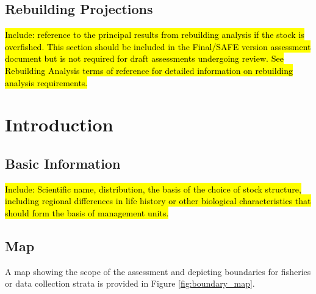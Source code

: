 \documentclass[12pt,]{article}
\begin{document}
\subsection*{Rebuilding Projections}\label{rebuilding-projections}

\hl{Include: reference to the principal results from rebuilding analysis if the 
stock is overfished. This section should be included in the Final/SAFE version 
assessment document but is not required for draft assessments undergoing review. 
See Rebuilding Analysis terms of reference for detailed information on 
rebuilding analysis requirements.}

\FloatBarrier

\newpage

\renewcommand{\thefigure}{\arabic{figure}}
\renewcommand{\thetable}{\arabic{table}}

\setcounter{figure}{0} \setcounter{table}{0} 

\section{}\label{section-1}

\section{}\label{section-2}

\section{Introduction}\label{introduction}

\subsection{Basic Information}\label{basic-information}

\hl{Include: Scientific name, distribution, the basis of the choice of stock structure, 
including regional differences in life history or other biological characteristics 
that should form the basis of management units.}

\subsection{Map}\label{map}

A map showing the scope of the assessment and depicting boundaries for
fisheries or data collection strata is provided in Figure
\ref{fig:boundary_map}.
\end{document}
